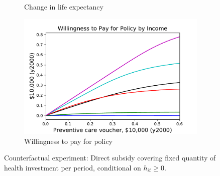 \documentclass[12pt,pdftex,letterpaper]{article}
\newcommand{\Health}{h}
\begin{document}
\begin{figure}[h!]
\begin{subfigure}[b]{0.49\textwidth}
        \caption{Change in life expectancy}
    \end{subfigure}
    \begin{subfigure}[b]{0.49\textwidth}
        \centering
        \includegraphics[width=\textwidth]{../Figures/PreventiveSubWTP.pdf}
        \caption{Willingness to pay for policy}
    \end{subfigure}
    \caption{Counterfactual experiment: Direct subsidy covering fixed quantity of health investment per period, conditional on $\Health_{it} \geq 0$.}
    \label{fig:PreventiveSub}
\end{figure}
\end{document}
